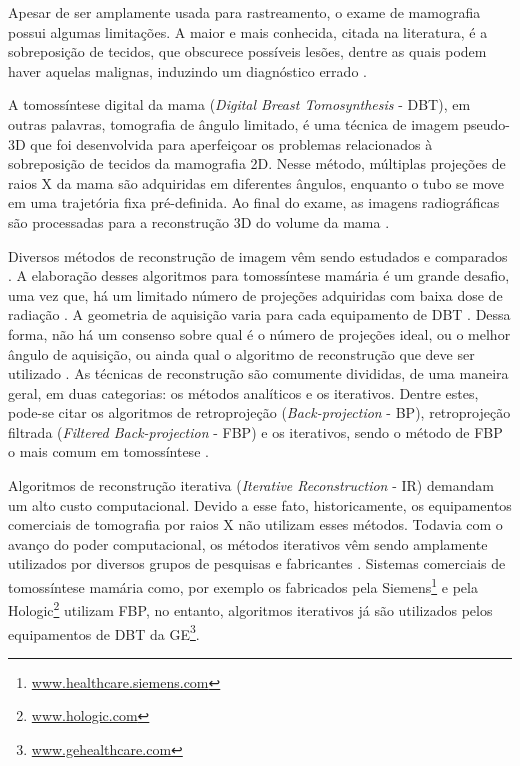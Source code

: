 Apesar de ser amplamente usada para rastreamento, o exame de mamografia possui algumas limitações. A maior e mais conhecida, citada na literatura, é a sobreposição de tecidos, que obscurece possíveis lesões, dentre as quais podem haver aquelas malignas, induzindo um diagnóstico errado \cite{vedantham2015digital}. 

A tomossíntese digital da mama (\textit{Digital Breast Tomosynthesis} - \acs{DBT}), em outras palavras, tomografia de ângulo limitado, é uma técnica de imagem pseudo-\acs{3D} que foi desenvolvida para aperfeiçoar os problemas relacionados à sobreposição de tecidos da mamografia \acs{2D}. Nesse método, múltiplas projeções de raios X da mama são adquiridas em diferentes ângulos, enquanto o tubo se move em uma trajetória fixa pré-definida. Ao final do exame, as imagens radiográficas são processadas para a reconstrução \acs{3D} do volume da mama \cite{vedantham2015digital}.  

Diversos métodos de reconstrução de imagem vêm sendo estudados e comparados \cite{wu2004comparison,zhang2006comparative}. A elaboração desses algoritmos para tomossíntese mamária é um grande desafio, uma vez que, há um limitado número de projeções adquiridas com baixa dose de radiação \cite{wu2004comparison}. A geometria de aquisição varia para cada equipamento de \acs{DBT} \cite{vedantham2015digital}. Dessa forma, não há um consenso sobre qual é o número de projeções ideal, ou o melhor ângulo de aquisição, ou ainda qual o algoritmo de reconstrução que deve ser utilizado \cite{sechopoulos2009optimization}. As técnicas de reconstrução são comumente divididas, de uma maneira geral, em duas categorias: os métodos analíticos e os iterativos. Dentre estes, pode-se citar os algoritmos de retroprojeção (\textit{Back-projection} - \acs{BP}), retroprojeção filtrada (\textit{Filtered Back-projection} - \acs{FBP}) e os iterativos, sendo o método de \acs{FBP} o mais comum em tomossíntese \cite{michell2018role}.  

Algoritmos de reconstrução iterativa (\textit{Iterative Reconstruction} - \acs{IR}) demandam um alto custo computacional. Devido a esse fato, historicamente, os equipamentos comerciais de tomografia por raios X não utilizam esses métodos. Todavia com o avanço do poder computacional, os métodos iterativos vêm sendo  amplamente utilizados por diversos grupos de pesquisas e fabricantes \cite{wu2003tomographic}. Sistemas comerciais de tomossíntese mamária como, por exemplo os fabricados pela Siemens\footnote{\url{www.healthcare.siemens.com}} e pela Hologic\footnote{\url{www.hologic.com}} utilizam \acs{FBP}, no entanto, algoritmos iterativos já são utilizados pelos equipamentos de \acs{DBT} da \ac{GE}\footnote{\url{www.gehealthcare.com}}. 

